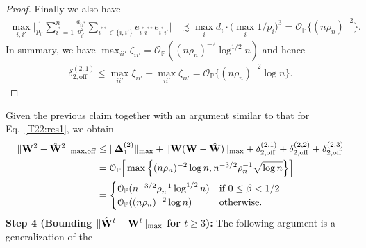 \documentclass[10pt,journal,compsoc]{IEEEtran}
\newcommand{\op}{\mathcal{O}_{\mathbb{P}}}
\newcommand*{\p}{\mathbb{P}}
\newcommand{\ee}{\end{aligned} \end{equation}}
\newcommand{\bds}{\boldsymbol}
\newcommand{\off}{\mathrm{off}}
\newcommand{\MD}{\mathbf{\Delta}}
\newcommand{\bee}{\begin{equation}\begin{aligned}}
\newcommand{\M}[1]{{{\mathbf{\MakeUppercase{#1}}}}}
\numberwithin{equation}{section}
\begin{document}
\begin{proof}
Finally we also have 
\bee
\max_{i,i'}\Big|\frac{1}{p_{i'}}\sum_{i^* = 1}^n
\frac{a_{ii^*}}{p_{i^*}^2} \sum_{i^{**} \in \{i,i'\}}e_{i^*i^{**}}
e_{i^*i'}\Big|
&\precsim \max_i d_i \cdot \Big(\max_i 1/p_i\Big)^3 
=\op\{(n\rho_n)^{-2}\}.
\ee
In summary, we have $\max_{ii'} \zeta_{ii'} =
\op((n\rho_n)^{-2}\log^{1/2}{n})$ and hence
\bee
 \delta_{2,\text{off}}^{(2,1)}
  \leq \max_{ii'} \xi_{ii'} +
  \max_{ii'} \zeta_{ii'} = \op\big\{(n\rho_n)^{-2} \log n\big\}.
\ee
\end{proof}
Given the previous claim together with an argument similar to that for
Eq.~\eqref{T22:res1}, we obtain
\begin{equation}
  \label{T22s:res2}
  \begin{split}
\|\M W^2 - \hat{\M W}^2\|_{\max,\off} 
&\leq \|\MD^{(2)}_1\|_{\max} + \|\M W(\M W - \hat{\M W})\|_{\max} + \delta^{(2,1)}_{2,\off} + \delta^{(2,2)}_{2,\off} + \delta^{(2,3)}_{2,\off} 
\\
&=\op\Big[\max\Big\{(n\rho_n)^{-2} \log n,n^{-3/2}\rho_n^{-1}\sqrt{\log n}\Big\}\Big]
\\ & =\begin{cases}
\op(n^{-3/2}\rho_n^{-1}\log^{1/2}{n}) & \text{if $0\leq \beta <1/2$}
\\
\op((n\rho_n)^{-2} \log n) & \text{otherwise.}
\end{cases}
\end{split}
\end{equation}
\textbf{Step 4 (Bounding $\|\hat{\M W}^{t} - \M W^{t}\|_{\max}$ for $t
\geq 3$):} The following argument is a generalization of the
\end{document}
